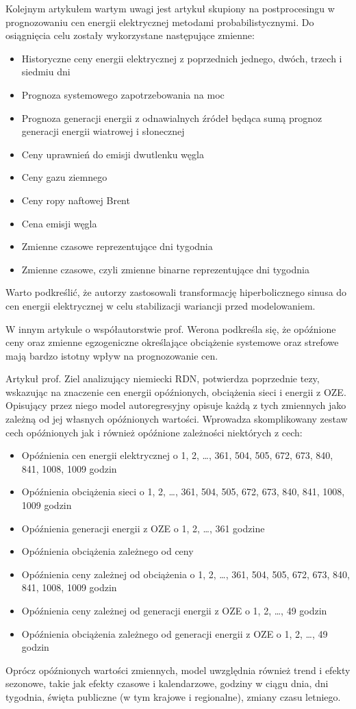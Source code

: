 Kolejnym artykułem wartym uwagi jest artykuł skupiony na postprocesingu \cite{LIPIECKI2024107934} w prognozowaniu cen energii elektrycznej metodami probabilistycznymi. Do osiągnięcia celu zostały wykorzystane następujące zmienne: 
\begin{itemize}
    \item Historyczne ceny energii elektrycznej z poprzednich jednego, dwóch, trzech i siedmiu dni
    \item Prognoza systemowego zapotrzebowania na moc
    \item Prognoza generacji energii z odnawialnych źródeł będąca sumą prognoz generacji energii wiatrowej i słonecznej
    \item Ceny uprawnień do emisji dwutlenku węgla
    \item Ceny gazu ziemnego
    \item Ceny ropy naftowej Brent
    \item Cena emisji węgla
    \item Zmienne czasowe reprezentujące dni tygodnia
    \item Zmienne czasowe, czyli zmienne binarne reprezentujące dni tygodnia
\end{itemize}
Warto podkreślić, że autorzy zastosowali transformację hiperbolicznego sinusa do cen energii elektrycznej w celu stabilizacji wariancji przed modelowaniem.

W innym artykule o współautorstwie prof. Werona \cite{en9080621} podkreśla się, że opóźnione ceny oraz zmienne egzogeniczne określające obciążenie systemowe oraz strefowe mają bardzo istotny wpływ na prognozowanie cen.

Artykuł prof. Ziel \cite{ZIEL201598} analizujący niemiecki RDN, potwierdza poprzednie tezy, wskazując na znaczenie cen energii opóźnionych, obciążenia sieci i energii z OZE. Opisujący przez niego model autoregresyjny opisuje każdą z tych zmiennych jako zależną od jej własnych opóźnionych wartości. Wprowadza skomplikowany zestaw cech opóźnionych jak i również opóźnione zależności niektórych z cech:
\begin{itemize}
    \item Opóźnienia cen energii elektrycznej o 1, 2, …, 361, 504, 505, 672, 673, 840, 841, 1008, 1009 godzin
    \item Opóźnienia obciążenia sieci o 1, 2, …, 361, 504, 505, 672, 673, 840, 841, 1008, 1009 godzin
    \item Opóźnienia generacji energii z OZE o 1, 2, …, 361 godzine
    \item Opóźnienia obciążenia zależnego od ceny
    \item Opóźnienia ceny zależnej od obciążenia o 1, 2, …, 361, 504, 505, 672, 673, 840, 841, 1008, 1009 godzin
    \item Opóźnienia ceny zależnej od generacji energii z OZE o 1, 2, …, 49 godzin
    \item Opóźnienia obciążenia zależnego od generacji energii z OZE o 1, 2, …, 49 godzin
\end{itemize}
Oprócz opóźnionych wartości zmiennych, model uwzględnia również trend i efekty sezonowe, takie jak efekty czasowe i kalendarzowe, godziny w ciągu dnia, dni tygodnia, święta publiczne (w tym krajowe i regionalne), zmiany czasu letniego.

